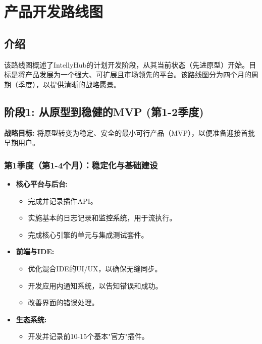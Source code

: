 \documentclass[11pt, a4paper, oneside]{article}
\begin{document}
\section{产品开发路线图} %
\subsection*{介绍}
该路线图概述了IntellyHub的计划开发阶段，从其当前状态（先进原型）开始。目标是将产品发展为一个强大、可扩展且市场领先的平台。该路线图分为四个月的周期（季度），以提供清晰的战略愿景。

\clearpage

\subsection{阶段1: 从原型到稳健的MVP (第1-2季度)}
\textbf{战略目标:} 将原型转变为稳定、安全的最小可行产品（MVP），以便准备迎接首批早期用户。

\subsubsection*{第1季度（第1-4个月）：稳定化与基础建设}
\begin{itemize}[leftmargin=*]
    \item \textbf{核心平台与后台:}
    \begin{itemize}
        \item 完成并记录插件API。
        \item 实施基本的日志记录和监控系统，用于流执行。
        \item 完成核心引擎的单元与集成测试套件。
    \end{itemize}
    \item \textbf{前端与IDE:}
    \begin{itemize}
        \item 优化混合IDE的UI/UX，以确保无缝同步。
        \item 开发应用内通知系统，以告知错误和成功。
        \item 改善界面的错误处理。
    \end{itemize}
    \item \textbf{生态系统:}
    \begin{itemize}
        \item 开发并记录前10-15个基本"官方"插件。
    \end{itemize}
\end{itemize}
\end{document}
